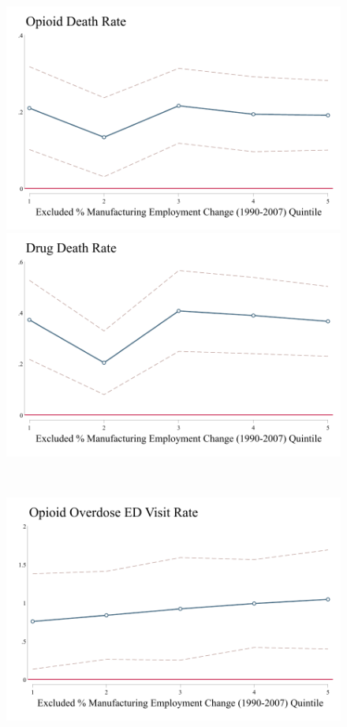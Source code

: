 \documentclass[12pt]{article}
\begin{document}
		\newpage
		\FloatBarrier
		\begin{figure}[h]
			\begin{minipage}[c]{0.48\linewidth}
				\centering
				\includegraphics[width=\linewidth]{../results/appendix/figures/opioid_by_man_quintile.pdf}
						  	\includegraphics[width=\linewidth]{../results/appendix/figures/drug_by_man_quintile.pdf}
			\end{minipage}
			~
			\hspace{0.05cm}
			\begin{minipage}[c]{0.48\linewidth}\centering
			  \centering
			  \includegraphics[width=\linewidth]{../results/appendix/figures/op_ovr_by_man_quintile.pdf}			  

\end{minipage}
\end{figure}
\end{document}
